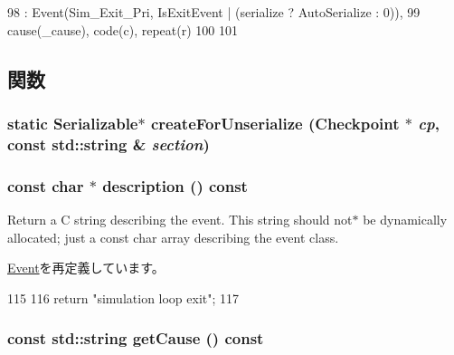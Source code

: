 \begin{DoxyCode}
98     : Event(Sim_Exit_Pri, IsExitEvent | (serialize ? AutoSerialize : 0)),
99       cause(_cause), code(c), repeat(r)
100 {
101 }
\end{DoxyCode}


\subsection{関数}
\hypertarget{classLocalSimLoopExitEvent_a1a972a5fa41c60f01855124f20e22959}{
\subsubsection[{createForUnserialize}]{\setlength{\rightskip}{0pt plus 5cm}static {\bf Serializable}$\ast$ createForUnserialize ({\bf Checkpoint} $\ast$ {\em cp}, \/  const std::string \& {\em section})}}
\label{classLocalSimLoopExitEvent_a1a972a5fa41c60f01855124f20e22959}
\hypertarget{classLocalSimLoopExitEvent_a5a14fe478e2393ff51f02e9b7be27e00}{
\subsubsection[{description}]{\setlength{\rightskip}{0pt plus 5cm}const char $\ast$ description () const}}
\label{classLocalSimLoopExitEvent_a5a14fe478e2393ff51f02e9b7be27e00}
Return a C string describing the event. This string should not$\ast$ be dynamically allocated; just a const char array describing the event class. 

\hyperlink{classEvent_a130ddddf003422b413e2e891b1b80e8f}{Event}を再定義しています。


\begin{DoxyCode}
115 {
116     return "simulation loop exit";
117 }
\end{DoxyCode}
\hypertarget{classLocalSimLoopExitEvent_adf610f0866baa489220e6d9f9e24cb4d}{
\subsubsection[{getCause}]{\setlength{\rightskip}{0pt plus 5cm}const std::string getCause () const}}
\label{classLocalSimLoopExitEvent_adf610f0866baa489220e6d9f9e24cb4d}



